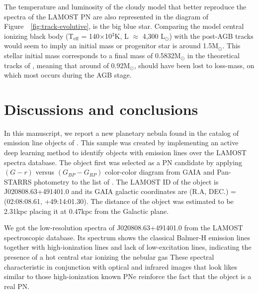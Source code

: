 \documentclass[fleqn,usenatbib]{mnras}
\begin{document}
The temperature and luminosity of the {\sc cloudy} model that better reproduce the spectra of the
LAMOST PN are also represented in the diagram of Figure~~\ref{fig:track-evolutive},
is the big blue star.
Comparing the model central ionizing black body (T$_{\text{eff}}$ = 140$\times$10$^{3}$K,
L $\approx$ 4,300 L$_{\odot}$) with the post-AGB tracks would seem to imply an
initial mass or progenitor star is around 1.5M$_{\odot}$. This stellar initial mass
corresponds to a final mass of 0.5832M$_{\odot}$ in the theoretical tracks of \citet{Miller:2016},
meaning that around of 0.92M$_{\odot}$, should have been lost to loss-mass,
on which most occurs during the AGB stage.


\section{Discussions and conclusions}
\label{sec:conclu}

In this manuscript, we report a new planetary nebula found
in the catalog of emission line objects of \citet{Skoda:2020}.
This sample was created by implementing an active deep learning method
to identify objects with emission lines over the LAMOST spectra database.
The object first was selected as a PN candidate by applying
\((G - r)\) versus \((G_{BP} - G_{RP})\) color-color diagram
from GAIA and Pan-STARRS photometry to the list of \citet{Skoda:2020}.
The LAMOST ID of the object is J020808.63+491401.0 and its
GAIA galactic coordinates are (R.A, DEC.) = (02:08:08.61, +49:14:01.30).
The distance of the object was estimated to be 2.31kpc placing
it at 0.47kpc from the Galactic plane.

We got the low-resolution spectra of J020808.63+491401.0 
from the LAMOST spectroscopic database. Its spectrum
shows the classical Balmer-H emission lines together with
high-ionization lines and lack of low-excitation lines,
indicating the presence of a hot central star ionizing the nebular gas
These spectral characteristic
in conjunction with optical and infrared images that look likes similar
to those high-ionization known PNe reinforce the fact that the object is
a real PN.
\end{document}
